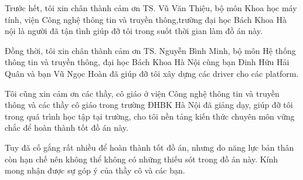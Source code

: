 \cleardoublepage


\begin{acknowledgements}

Trước hết,  tôi xin chân thành cảm ơn TS. Vũ Văn Thiệu, bộ môn Khoa học máy tính, viện Công nghệ thông tin và truyền thông,trường đại học Bách Khoa Hà nội là người đã tận tình giúp đỡ tôi trong suốt thời gian làm đồ án này. 

Đồng thời, tôi xin chân thành cảm ơn TS. Nguyễn Bình Minh, bộ môn Hệ thống thông tin và truyền thông, đại học Bách Khoa Hà Nội cùng bạn Đinh Hữu Hải Quân và bạn Vũ Ngọc Hoàn đã giúp đỡ tôi xây dựng các driver cho các platform.

Tôi cũng xin cảm ơn các thầy, cô giáo ở viện Công nghệ thông tin và truyền thông và các thầy cô giáo trong trường ĐHBK Hà Nội đã giảng dạy, giúp đỡ tôi trong quá trình học tập tại trường, cho tôi nền tảng kiến thức chuyên môn vững chắc để hoàn thành tốt đồ án này. 

Tuy đã cố gắng rất nhiều để hoàn thành tốt đồ án, nhưng do năng lực bản thân còn hạn chế nên không thể không có những thiếu sót trong đồ án này. Kính mong nhận được sự góp ý của thầy cô và các bạn.


\end{acknowledgements}
\clearpage